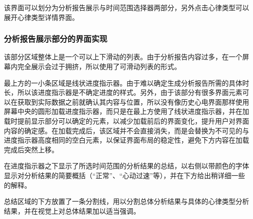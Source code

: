 \begin{figure}[ht]
    \label{fig:analytics}
\end{figure}

该界面可以划分为分析报告展示与时间范围选择器两部分，另外点击心律类型可以展开心律类型详情界面。

\subsubsection{分析报告展示部分的界面实现}\label{subsubsec:analytics-display-ui}

该部分区域整体上是一个可以上下滑动的列表。由于分析报告内容过多，在一个屏幕内完全展示会过于拥挤，所以使用了可滑动列表的形式。

最上方的一小条区域是线状进度指示器。由于难以确定生成分析报告所需的具体时长，所以该进度指示器是不确定进度的样式。另外，由于该部分有很多界面元素可以在获取到实际数据之前就确认其内容与位置，所以没有像历史心电界面那样使用屏幕中央的圆形加载进度指示器，而只是在最上方使用了线状进度指示器，并在加载时提前显示部分可以确定的元素，以减少加载前后的界面变化，提升用户对界面内容的确定感。在加载完成后，该区域并不会直接消失，而是会替换为不可见的与进度指示器高度相同的空白元素，以保证界面布局的稳定性，避免下方内容在加载完成后突然上移。

在进度指示器之下显示了所选时间范围的分析结果的总结，以右侧以带颜色的字体显示对分析结果的简要概括（“正常”、“心动过速”等），并在下方给出稍详细一些的解释。

总结区域的下方放置了一条分割线，用以分割总体分析结果与具体的心律类型分析结果，并在视觉上对总体结果加以适当强调。

